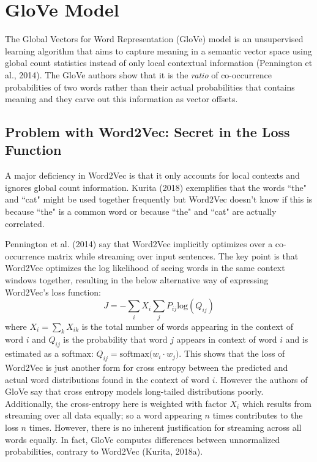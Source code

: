 \section{GloVe Model} \label{sec:Glove}

The Global Vectors for Word Representation (GloVe) model is an unsupervised learning algorithm that aims to capture meaning in a semantic vector space using global count statistics instead of only local contextual information (Pennington et al., 2014). The GloVe authors show that it is the \emph{ratio} of co-occurrence probabilities of two words rather than their actual probabilities that contains meaning and they carve out this information as vector offsets. 

\subsection{Problem with Word2Vec: Secret in the Loss Function} \label{sec:ProblemWord2VecFromGloveStandpoint}

A major deficiency in Word2Vec is that it only accounts for local contexts and ignores global count information. Kurita (2018) exemplifies that the words ``the" and ``cat" might be used together frequently but Word2Vec doesn't know if this is because ``the" is a common word or because ``the" and ``cat" are actually correlated. 

Pennington et al. (2014) say that Word2Vec implicitly optimizes over a co-occurrence matrix while streaming over input sentences. The key point is that Word2Vec optimizes the log likelihood of seeing words in the same context windows together, resulting in the below alternative way of expressing Word2Vec's loss function: 
$$
J = - \sum_i X_i \sum_j P_{ij} \text{log}(Q_{ij}) 
$$
where $X_i = \sum_k X_{ik}$ is the total number of words appearing in the context of word $i$ and $Q_{ij}$ is the probability that word $j$ appears in context of word $i$ and is estimated as a softmax: $Q_{ij} = \text{softmax} \Big( w_i \cdot w_j \Big)$. This shows that the loss of Word2Vec is just another form for cross entropy between the predicted and actual word distributions found in the context of word $i$. However the authors of GloVe say that cross entropy models long-tailed distributions poorly. Additionally, the cross-entropy here is weighted with factor $X_i$ which results from streaming over all data equally; so a word appearing $n$ times contributes to the loss $n$ times. 
However, there is no inherent justification for streaming across all words equally. In fact, GloVe computes differences between unnormalized probabilities, contrary to Word2Vec (Kurita, 2018a). 


